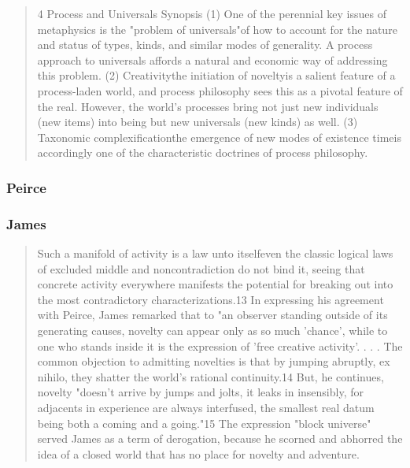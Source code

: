 \documentclass[a4paper]{Thesis}
\begin{document}
\begin{quotation}
	4
	Process and Universals
	Synopsis
	(1) One of the perennial key issues of metaphysics is the "problem of universals"of how to account for the nature
	and status of types, kinds, and similar modes of generality. A process approach to universals affords a natural and
	economic way of addressing this problem. (2) Creativitythe initiation of noveltyis a salient feature of a process-laden
	world, and process philosophy sees this as a pivotal feature of the real. However, the world's processes bring not
	just new individuals (new items) into being but new universals (new kinds) as well. (3) Taxonomic
	complexificationthe emergence of new modes of existence timeis accordingly one of the characteristic doctrines of
	process philosophy.
\end{quotation}

\subsubsection{Peirce}
\subsubsection{James}
\begin{quotation}
	Such a manifold of
	activity is a law unto itselfeven the classic logical laws of excluded middle and
	noncontradiction do not bind it, seeing that concrete activity everywhere manifests the
	potential for breaking out into the most contradictory characterizations.13 In expressing
	his agreement with Peirce, James remarked that to "an observer standing outside of its
	generating causes, novelty can appear only as so much 'chance', while to one who stands
	inside it is the expression of 'free creative activity'. . . . The common objection to
	admitting novelties is that by jumping abruptly, ex nihilo, they shatter the world's rational
	continuity.14 But, he continues, novelty "doesn't arrive by jumps and jolts, it leaks in
	insensibly, for adjacents in experience are always interfused, the smallest real datum
	being both a coming and a going."15 The expression "block universe" served James as a
	term of derogation, because he scorned and abhorred the idea of a closed world that has
	no place for novelty and adventure.
\end{quotation}
\end{document}
